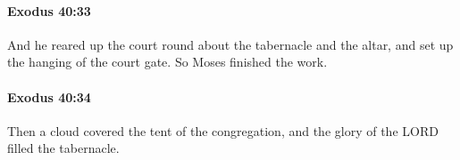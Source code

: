 		\paragraph{Exodus 40:33} %
			\label{EXODUS-40-33}

			And he reared up the court round about the tabernacle and the altar, and set up the hanging of the court gate. So Moses finished the work.


		\paragraph{Exodus 40:34} %
			\label{EXODUS-40-34}

			Then a cloud covered the tent of the congregation, and the glory of the LORD filled the tabernacle.


